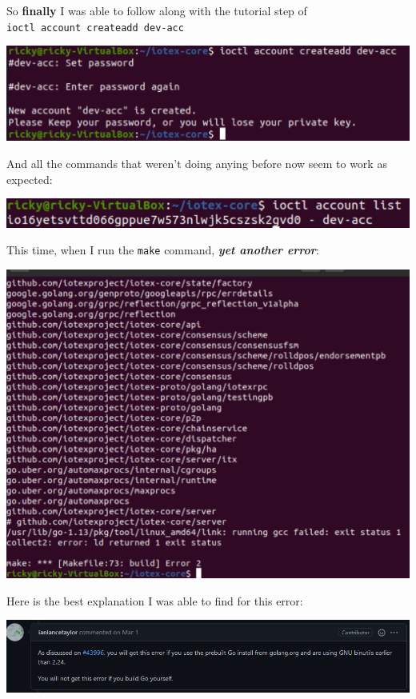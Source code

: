 \documentclass[
]{book}
\begin{document}
So \textbf{finally} I was able to follow along with the tutorial step of
\texttt{ioctl\ account\ createadd\ dev-acc}

\includegraphics{images/create_account_works.PNG}

And all the commands that weren't doing anying before now seem to work
as expected:

\includegraphics{images/list_accounts.PNG}

This time, when I run the \texttt{make} command, \textbf{\emph{yet
another error}}:

\includegraphics{images/linux_testnet_error.PNG}

Here is the best explanation I was able to find for this error:

\includegraphics{images/golang_error.PNG}
\end{document}
